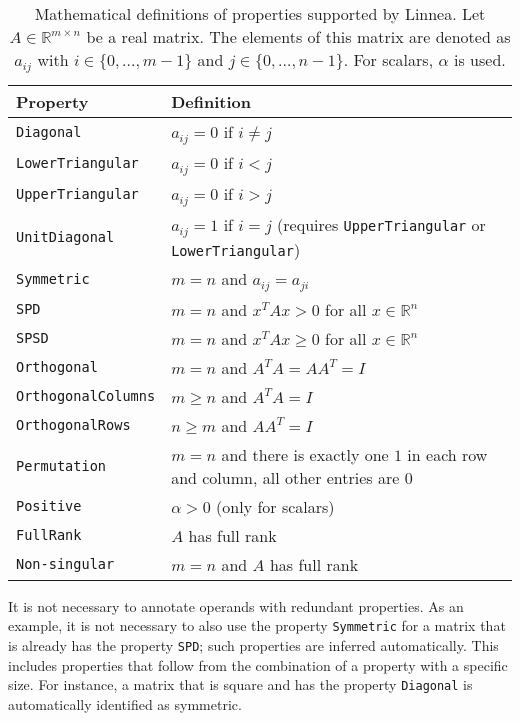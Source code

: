 \documentclass[
  12pt,
  a4paper,
]{scrartcl}
\begin{document}
\begin{table}
\centering
\begin{tabular}{lp{7cm}}
\toprule
Property & Definition \\
\midrule
\texttt{Diagonal} & $a_{ij} = 0$ if $i \neq j$ \\
\texttt{LowerTriangular} & $a_{ij} = 0$ if $i < j$ \\
\texttt{UpperTriangular} & $a_{ij} = 0$ if $i > j$ \\
\texttt{UnitDiagonal} & $a_{ij} = 1$ if $i = j$ (requires \texttt{Up\-per\-Tri\-an\-gu\-lar} or \texttt{LowerTriangular}) \\
\texttt{Symmetric} & $m = n$ and $a_{ij} = a_{ji}$ \\
\texttt{SPD} & $m = n$ and $x^T A x > 0$ for all $x \in \mathbb{R}^n$ \\
\texttt{SPSD} & $m = n$ and $x^T A x \geq 0$ for all $x \in \mathbb{R}^n$ \\
\texttt{Orthogonal} & $m = n$ and $A^T A = A A^T = I$ \\
\texttt{OrthogonalColumns} & $m \geq n$ and $A^T A = I$ \\
\texttt{OrthogonalRows} & $n \geq m$ and $A A^T = I$ \\
\texttt{Permutation} & $m = n$ and there is exactly one $1$ in each row and column, all other entries are $0$ \\
\texttt{Positive} & $\alpha > 0$ (only for scalars)  \\
\texttt{FullRank} & $A$ has full rank \\
\texttt{Non-singular} & $m = n$ and $A$ has full rank \\
\bottomrule
\end{tabular}
\caption{Mathematical definitions of properties supported by Linnea. Let $A \in \mathbb{R}^{m \times n}$ be a real matrix. The elements of this matrix are denoted as $a_{ij}$ with $i \in \{0, \ldots, m-1\}$ and $j \in \{0, \ldots, n-1\}$. For scalars, $\alpha$ is used.}
\label{tab:properties}
\end{table}

It is not necessary to annotate operands with redundant properties. As an example, it is not necessary to also use the property \texttt{Symmetric} for a matrix that is already has the property \texttt{SPD}; such properties are inferred automatically. This includes properties that follow from the combination of a property with a specific size. For instance, a matrix that is square and has the property \texttt{Diagonal} is automatically identified as symmetric.
\end{document}
